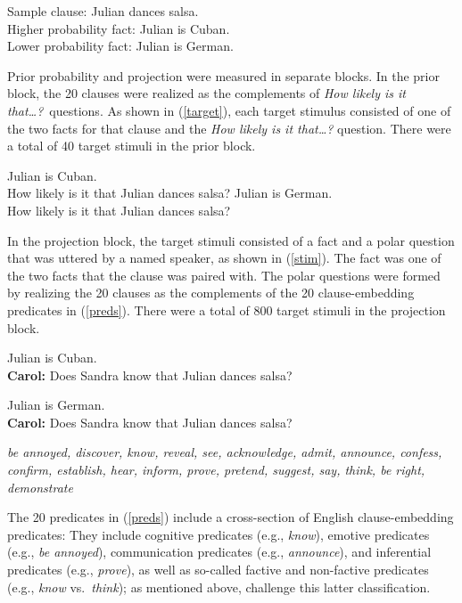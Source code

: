 \documentclass[11pt,fleqn]{article}
\newcommand{\6}{\mbox{$[\hspace*{-.6mm}[$}}
\newcommand{\9}{\mbox{$]\hspace*{-.6mm}]$}}
\begin{document}
\begin{exe}
\ex\label{sample-clause} Sample clause: Julian dances salsa.
\\ Higher probability fact: Julian is Cuban.
\\ Lower probability fact: Julian is German.
\end{exe}

Prior probability and projection were measured in separate blocks. In the prior block, the 20 clauses were realized as the complements of {\em How likely is it that\ldots?}~questions. As shown in (\ref{target}), each target stimulus consisted of one of the two facts for that clause and the {\em How likely is it that\ldots?} question. There were a total of 40 target stimuli in the prior block.

\begin{exe}
\ex\label{target}  %
\begin{xlist}
 Julian is Cuban. \\ How likely is it that Julian dances salsa?
 Julian is German.  \\ How likely is it that Julian dances salsa?
\end{xlist}
\end{exe}

In the projection block, the target stimuli consisted of a fact and a polar question that was uttered by a named speaker, as shown in (\ref{stim}). The fact was one of the two facts that the clause was paired with. The polar questions were formed by realizing the 20 clauses as the complements of the 20 clause-embedding predicates in (\ref{preds}).  There were a total of 800 target stimuli in the projection block.

\begin{exe}
\ex\label{stim} %
\begin{xlist}
 Julian is Cuban.  \\ 
{\bf Carol:} Does Sandra know that Julian dances salsa?

 Julian is German.  \\ 
{\bf Carol:} Does Sandra know that Julian dances salsa?
\end{xlist}
\end{exe}

\begin{exe}
\ex\label{preds} %

{\em be annoyed, discover, know, reveal, see, acknowledge, admit, announce, confess, confirm, establish, hear, inform, prove, pretend, suggest, say, think, be right, demonstrate}
\end{exe}
The 20 predicates in (\ref{preds}) include a cross-section of English clause-embedding predicates: They include cognitive predicates (e.g., {\em know}), emotive predicates (e.g., {\em be annoyed}), communication predicates (e.g., {\em announce}), and inferential predicates (e.g., {\em prove}), as well as so-called factive and non-factive predicates (e.g., {\em know} vs.\ {\em think}); as mentioned above,  challenge this latter classification.
\end{document}
